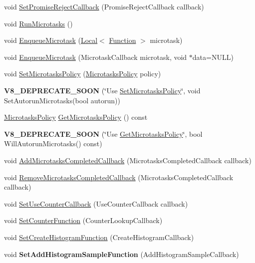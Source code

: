 \begin{DoxyCompactItemize}
\item 
void \hyperlink{classv8_1_1_isolate_a702f0ba4e5dee8a98aeb92239d58784e}{Set\+Promise\+Reject\+Callback} (Promise\+Reject\+Callback callback)
\item 
void \hyperlink{classv8_1_1_isolate_ac3cbe2a1632eb863912640dcfc98b6c8}{Run\+Microtasks} ()
\item 
void \hyperlink{classv8_1_1_isolate_a79a222a1a662d08479d5a1880c6793c5}{Enqueue\+Microtask} (\hyperlink{classv8_1_1_local}{Local}$<$ \hyperlink{classv8_1_1_function}{Function} $>$ microtask)
\item 
void \hyperlink{classv8_1_1_isolate_ad4d6c7dfdfc6c1bc857841de7e9967c3}{Enqueue\+Microtask} (Microtask\+Callback microtask, void $\ast$data=N\+U\+LL)
\item 
void \hyperlink{classv8_1_1_isolate_a6bc2069413d88ad90e4c8bee0b9e4037}{Set\+Microtasks\+Policy} (\hyperlink{namespacev8_a2f183b102b3d1b7a30a805e8c53c04da}{Microtasks\+Policy} policy)
\item 
{\bfseries V8\+\_\+\+D\+E\+P\+R\+E\+C\+A\+T\+E\+\_\+\+S\+O\+ON} (\char`\"{}Use \hyperlink{classv8_1_1_isolate_a6bc2069413d88ad90e4c8bee0b9e4037}{Set\+Microtasks\+Policy}\char`\"{}, void Set\+Autorun\+Microtasks(bool autorun))\hypertarget{classv8_1_1_isolate_a46bdd3b0109fd0a981462a83b1fe366a}{}\label{classv8_1_1_isolate_a46bdd3b0109fd0a981462a83b1fe366a}

\item 
\hyperlink{namespacev8_a2f183b102b3d1b7a30a805e8c53c04da}{Microtasks\+Policy} \hyperlink{classv8_1_1_isolate_a65ccc10f75f9497b6baf9535cf3f30db}{Get\+Microtasks\+Policy} () const 
\item 
{\bfseries V8\+\_\+\+D\+E\+P\+R\+E\+C\+A\+T\+E\+\_\+\+S\+O\+ON} (\char`\"{}Use \hyperlink{classv8_1_1_isolate_a65ccc10f75f9497b6baf9535cf3f30db}{Get\+Microtasks\+Policy}\char`\"{}, bool Will\+Autorun\+Microtasks() const)\hypertarget{classv8_1_1_isolate_a5123e1c47b45af3cdf51d6f635fef1f0}{}\label{classv8_1_1_isolate_a5123e1c47b45af3cdf51d6f635fef1f0}

\item 
void \hyperlink{classv8_1_1_isolate_ae9c09d4763df6c3f06c686eebcce2834}{Add\+Microtasks\+Completed\+Callback} (Microtasks\+Completed\+Callback callback)
\item 
void \hyperlink{classv8_1_1_isolate_a0fdc58db0d44c5a8f427d809e1c0b604}{Remove\+Microtasks\+Completed\+Callback} (Microtasks\+Completed\+Callback callback)
\item 
void \hyperlink{classv8_1_1_isolate_ad608b24b2c1b49a97ed4f04500976166}{Set\+Use\+Counter\+Callback} (Use\+Counter\+Callback callback)
\item 
void \hyperlink{classv8_1_1_isolate_ab59a904591d417ebb3889b5fa507447b}{Set\+Counter\+Function} (Counter\+Lookup\+Callback)
\item 
void \hyperlink{classv8_1_1_isolate_afd624c7e429a061c1cd9e5959ce6ebf0}{Set\+Create\+Histogram\+Function} (Create\+Histogram\+Callback)
\item 
void {\bfseries Set\+Add\+Histogram\+Sample\+Function} (Add\+Histogram\+Sample\+Callback)\hypertarget{classv8_1_1_isolate_ae5c813518efe1cfaccd0262ad6ed2f82}{}\label{classv8_1_1_isolate_ae5c813518efe1cfaccd0262ad6ed2f82}


\end{DoxyCompactItemize}
